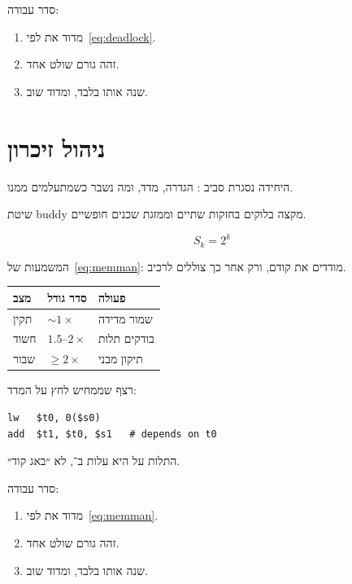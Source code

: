 סדר עבודה:
\begin{enumerate}
\item[(\textbf{א})] מדוד את  לפי~\eqref{eq:deadlock}.
\item[(\textbf{ב})] זהה גורם שולט אחד.
\item[(\textbf{ג})] שנה אותו בלבד, ומדוד שוב.
\end{enumerate}

\chapter{ניהול זיכרון}
\label{ch:memman}

היחידה נסגרת סביב : הגדרה, מדד, ומה נשבר כשמתעלמים ממנו.

\begin{defbox}[frametitle={הגדרה — ניהול זיכרון}]
שיטת buddy מקצה בלוקים בחזקות שתיים וממזגת שכנים חופשיים.
\end{defbox}

\begin{equation}
\label{eq:memman}
S_k = 2^k
\end{equation}

המשמעות של~\eqref{eq:memman}: מודדים את  קודם, ורק אחר כך צוללים לרכיב.

\begin{tablebox}\centering\small
\begin{tabular}{@{}lll@{}}
\toprule
\textbf{מצב} & \textbf{סדר גודל} & \textbf{פעולה}\\
\midrule
תקין & $\sim 1\times$ & שמור מדידה\\
חשוד & $1.5$–$2\times$ & בודקים תלות\\
שבור & $\ge 2\times$ & תיקון מבני\\
\bottomrule
\end{tabular}
\end{tablebox}

רצף שממחיש לחץ על המדד:
\begin{asmblock}
\begin{lstlisting}[style=asm]
lw   $t0, 0($s0)
add  $t1, $t0, $s1   # depends on t0
\end{lstlisting}
\end{asmblock}
התלות על  היא עלות ב־, לא ״באג קוד״.

סדר עבודה:
\begin{enumerate}
\item[(\textbf{א})] מדוד את  לפי~\eqref{eq:memman}.
\item[(\textbf{ב})] זהה גורם שולט אחד.
\item[(\textbf{ג})] שנה אותו בלבד, ומדוד שוב.
\end{enumerate}

